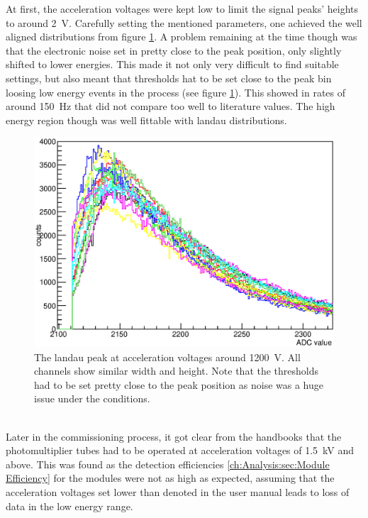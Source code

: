 	At first, the acceleration voltages were kept low to limit the signal peaks' heights to around \SI{2}{\volt}. Carefully setting the mentioned parameters, one achieved the well aligned distributions from figure \ref{fig:allPeaksBefore}. A problem remaining at the time though was that the electronic noise set in pretty close to the peak position, only slightly shifted to lower energies. This made it not only very difficult to find suitable settings, but also meant that thresholds hat to be set close to the peak bin loosing low energy events in the process (see figure \ref{fig:allPeaksBefore}). This showed in rates of around \SI{150}{\hertz} that did not compare too well to literature values. The high energy region though was well fittable with landau distributions.\\
	\begin{figure}
		\centering
		\includegraphics[width = 0.9 \textwidth]{graphics/setup/LandauPeaksRun660_old.eps}
		\caption[Landau peak \SI{1200}{\volt} acceleration voltage]{The landau peak at acceleration voltages around \SI{1200}{\volt}. All channels show similar width and height. Note that the thresholds had to be set pretty close to the peak position as noise was a huge issue under the conditions.}
		\label{fig:allPeaksBefore}
	\end{figure}\\
	Later in the commissioning process, it got clear from the handbooks that the photomultiplier tubes had to be operated at acceleration voltages of \SI{1.5}{\kilo\volt} and above. 
	This was found as the detection efficiencies \ref{ch:Analysis:sec:Module Efficiency} for the modules were not as high as expected, assuming that the acceleration voltages set lower than denoted in the user manual leads to loss of data in the low energy range.
